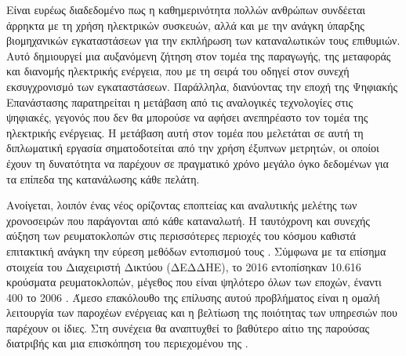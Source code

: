 Είναι ευρέως διαδεδομένο πως η καθημερινότητα πολλών ανθρώπων συνδέεται άρρηκτα με τη χρήση ηλεκτρικών συσκευών, αλλά και με την ανάγκη ύπαρξης βιομηχανικών εγκαταστάσεων για την εκπλήρωση των καταναλωτικών τους επιθυμιών. Αυτό δημιουργεί μια αυξανόμενη ζήτηση στον τομέα της παραγωγής, της μεταφοράς και διανομής ηλεκτρικής ενέργεια, που με τη σειρά του οδηγεί στον συνεχή εκσυγχρονισμό των εγκαταστάσεων. Παράλληλα, διανύοντας την εποχή της Ψηφιακής Επανάστασης παρατηρείται η μετάβαση από τις αναλογικές τεχνολογίες στις ψηφιακές, γεγονός που δεν θα μπορούσε να αφήσει ανεπηρέαστο τον τομέα της ηλεκτρικής ενέργειας. Η μετάβαση αυτή στον τομέα που μελετάται σε αυτή τη διπλωματική εργασία σηματοδοτείται από την χρήση έξυπνων μετρητών, οι οποίοι έχουν τη δυνατότητα να παρέχουν σε πραγματικό χρόνο μεγάλο όγκο δεδομένων για τα επίπεδα της κατανάλωσης κάθε πελάτη.\par
Ανοίγεται, λοιπόν ένας νέος ορίζοντας εποπτείας και αναλυτικής μελέτης των χρονοσειρών που παράγονται από κάθε καταναλωτή. Η ταυτόχρονη και συνεχής αύξηση των ρευματοκλοπών στις περισσότερες περιοχές του κόσμου καθιστά επιτακτική ανάγκη την εύρεση μεθόδων εντοπισμού τους . Σύμφωνα με τα επίσημα στοιχεία του Διαχειριστή Δικτύου (ΔΕΔΔΗΕ), το 2016 εντοπίσηκαν 10.616 κρούσματα ρευματοκλοπών, μέγεθος που είναι ψηλότερο όλων των εποχών, έναντι 400 το 2006 \cite{energypress}. Άμεσο επακόλουθο της επίλυσης αυτού προβλήματος είναι η ομαλή λειτουργία των παροχέων ενέργειας και η βελτίωση της ποιότητας των υπηρεσιών που παρέχουν οι ίδιες. Στη συνέχεια θα αναπτυχθεί το βαθύτερο αίτιο της παρούσας διατριβής και μια επισκόπηση του περιεχομένου της \cite{theftanalysis}.
